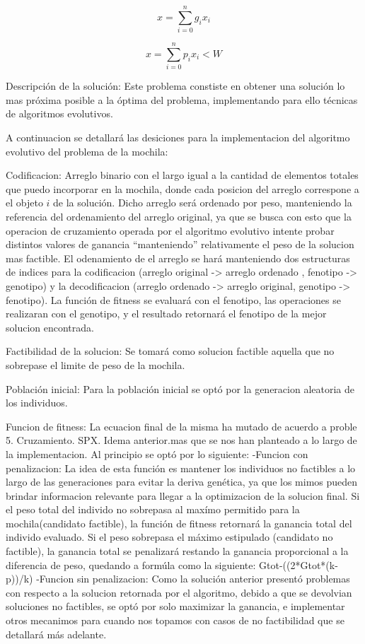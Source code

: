 \documentclass[9pt,conference]{IEEEtran}
\begin{document}
	\begin{equation}
	\label{eqn_tot_gain}
	x = \sum\limits_{i=0}^{n} g_{i}x_{i}
	\end{equation}

	\begin{equation}
	\label{eqn_tot_peso}
	x = \sum\limits_{i=0}^{n} p_{i}x_{i} < W
	\end{equation}

	
	Descripción de la solución:
	Este problema constiste en obtener una solución lo mas próxima posible a la óptima del problema, implementando para ello técnicas de algoritmos evolutivos.
	
	A continuacion se detallará las desiciones para la implementacion del algoritmo evolutivo del problema de la mochila:
	
	Codificacion:
		Arreglo binario con el largo igual a la cantidad de elementos totales que puedo incorporar en la mochila, donde cada posicion del arreglo correspone a el objeto $i$ de la solución. Dicho arreglo será ordenado por peso, manteniendo la referencia del ordenamiento del arreglo original, ya que se busca con esto que la operacion de cruzamiento operada por el algoritmo evolutivo intente probar distintos valores de ganancia ``manteniendo'' relativamente el peso de la solucion mas factible.
		El odenamiento de el arreglo se hará manteniendo dos estructuras de indices para la codificacion (arreglo original -> arreglo ordenado , fenotipo -> genotipo) y la decodificacion (arreglo ordenado -> arreglo original, genotipo -> fenotipo). La función de fitness se evaluará con el fenotipo, las operaciones se realizaran con el genotipo, y el resultado retornará el fenotipo de la mejor solucion encontrada.

	Factibilidad de la solucion: Se tomará como solucion factible aquella que no sobrepase el limite de peso de la mochila.
			
	Población inicial:
	Para la población inicial se optó por la generacion aleatoria de los individuos.
		
	Funcion de fitness:
	La ecuacion final de la misma ha mutado de acuerdo a proble	5. Cruzamiento.
		SPX. Idema anterior.mas que se nos han planteado a lo largo de la implementacion. Al principio se optó por lo siguiente:	
	-Funcion con penalizacion:
	La idea de esta función es mantener los individuos no factibles a lo largo de las generaciones para evitar la deriva genética, ya que los mimos pueden brindar informacion relevante para llegar a la optimizacion de la solucion final.
		Si el peso total del individo no sobrepasa al maxímo permitido para la mochila(candidato factible), la función de fitness retornará la ganancia total del individo evaluado.
		Si el peso sobrepasa el máximo estipulado (candidato no factible), la ganancia total se penalizará restando la ganancia proporcional a la diferencia de peso, quedando a formúla como la siguiente:
				Gtot-((2*Gtot*(k-p))/k)
	-Funcion sin penalizacion:
	Como la solución anterior presentó problemas con respecto a la solucion retornada por el algoritmo, debido a que se devolvian soluciones no factibles, se optó por solo maximizar la ganancia, e implementar otros mecanimos para cuando nos topamos con casos de no factibilidad que se detallará más adelante.
	
\end{document}
